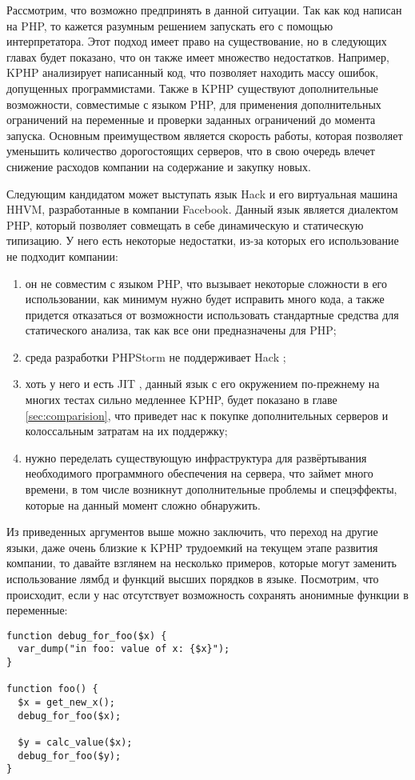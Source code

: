 Рассмотрим, что возможно предпринять в данной ситуации. 
Так как код написан на PHP, то кажется разумным решением запускать его с помощью интерпретатора.
Этот подход имеет право на существование, но в следующих главах будет показано, что он также имеет множество недостатков.
Например, KPHP анализирует написанный код, что позволяет находить массу ошибок, допущенных программистами.
Также в KPHP существуют дополнительные возможности, совместимые с языком PHP, для применения дополнительных ограничений на переменные и проверки заданных ограничений до момента запуска.
Основным преимуществом является скорость работы, которая позволяет уменьшить количество дорогостоящих серверов, что в свою очередь влечет снижение расходов компании на содержание и закупку новых.

Следующим кандидатом может выступать язык Hack и его виртуальная машина HHVM, разработанные в компании Facebook.
Данный язык является диалектом PHP, который позволяет совмещать в себе динамическую и статическую типизацию.
У него есть некоторые недостатки, из-за которых его использование не подходит компании:
\begin{enumerate}
\item он не совместим с языком PHP, что вызывает некоторые сложности в его использовании, как минимум нужно будет исправить много кода, а также придется отказаться от возможности использовать стандартные средства для статического анализа, так как все они предназначены для PHP;

\item среда разработки PHPStorm не поддерживает Hack \cite{hack-postponed};

\item хоть у него и есть JIT \cite{hack-jit}, данный язык с его окружением по-прежнему на многих тестах сильно медленнее KPHP, будет показано в главе \ref{sec:comparision}, что приведет нас к покупке дополнительных серверов и колоссальным затратам на их поддержку;

\item нужно переделать существующую инфраструктура для развёртывания необходимого программного обеспечения на сервера, что займет много времени, в том числе возникнут дополнительные проблемы и спецэффекты, которые на данный момент сложно обнаружить.
\end{enumerate}

Из приведенных аргументов выше можно заключить, что переход на другие языки, даже очень близкие к KPHP трудоемкий на текущем этапе развития компании, то давайте взглянем на несколько примеров, которые могут заменить использование лямбд и функций высших порядков в языке.
Посмотрим, что происходит, если у нас отсутствует возможность сохранять анонимные функции в переменные:
\begin{lstlisting}[caption={Пример кода без анонимных функций},label={without_lambda}]
function debug_for_foo($x) {
  var_dump("in foo: value of x: {$x}");
}

function foo() {
  $x = get_new_x();
  debug_for_foo($x);

  $y = calc_value($x);
  debug_for_foo($y);
}
\end{lstlisting}

